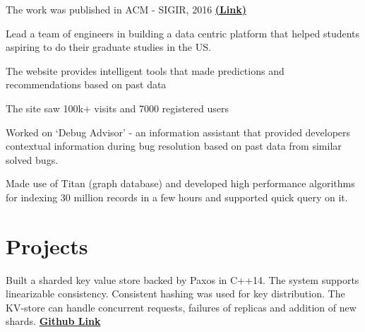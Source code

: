\documentclass[]{resume-openfont}
\begin{document}
\begin{minipage}[t]{0.74\textwidth}
\begin{tightemize}
\item The work was published in ACM - SIGIR, 2016  \textbf{\href{http://dl.acm.org/citation.cfm?id=2911451.2911458}{(Link)}}
\end{tightemize}
\sectionsep

{}
\begin{tightemize}
\item Lead a team of engineers in building a data centric platform that helped students aspiring to do their graduate studies in the US. 
\item The website provides intelligent tools that made predictions and recommendations based on past data
\item The site saw 100k+ visits and 7000 registered users
\end{tightemize}
\sectionsep


\begin{tightemize}
\item Worked on ‘Debug Advisor’ - an information assistant that provided developers contextual information during bug resolution based on past data from similar solved bugs. 
\item Made use of Titan (graph database) and developed high performance algorithms for indexing 30 million records in a few hours and supported quick query on it.
\end{tightemize}
\sectionsep


\section{Projects}
Built a sharded key value store backed by Paxos in C++14. The system supports linearizable consistency. Consistent hashing was used for key distribution. The KV-store can handle concurrent requests, failures of replicas and addition of new shards. \textbf{\href{https://github.com/pranavr93/sharded_key_value_store}{Github Link}}
\sectionsep


\end{minipage}
\end{document}

